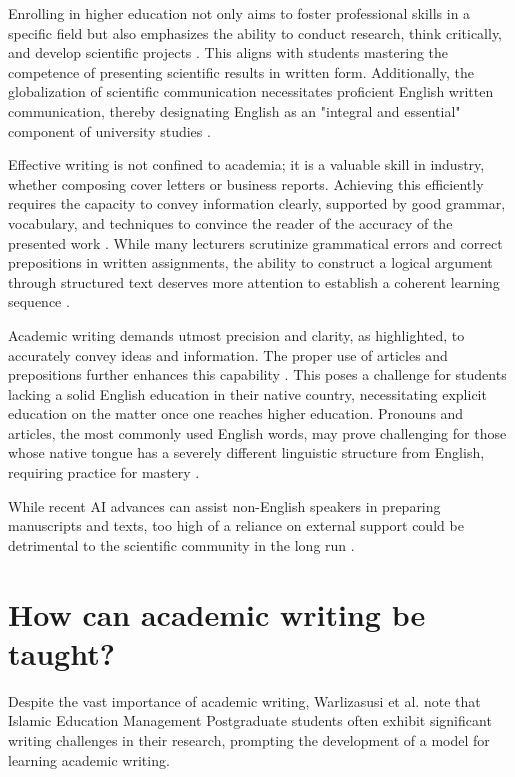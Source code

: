 \documentclass[a4paper,12pt]{article}
\begin{document}
Enrolling in higher education not only aims to foster professional skills in a specific field but also emphasizes the ability to conduct research, think critically, and develop scientific projects \cite{Source2}. This aligns with students mastering the competence of presenting scientific results in written form. Additionally, the globalization of scientific communication necessitates proficient English written communication, thereby designating English as an "integral and essential" component of university studies \cite{Source2}.

Effective writing is not confined to academia; it is a valuable skill in industry, whether composing cover letters or business reports. Achieving this efficiently requires the capacity to convey information clearly, supported by good grammar, vocabulary, and techniques to convince the reader of the accuracy of the presented work \cite{Source2}. While many lecturers scrutinize grammatical errors and correct prepositions in written assignments, the ability to construct a logical argument through structured text deserves more attention to establish a coherent learning sequence \cite{Source2}.

Academic writing demands utmost precision and clarity, as highlighted, to accurately convey ideas and information. The proper use of articles and prepositions further enhances this capability \cite{Source3}. This poses a challenge for students lacking a solid English education in their native country, necessitating explicit education on the matter once one reaches higher education. Pronouns and articles, the most commonly used English words, may prove challenging for those whose native tongue has a severely different linguistic structure from English, requiring practice for mastery \cite{Source3}.

While recent AI advances can assist non-English speakers in preparing manuscripts and texts, too high of a reliance on external support could be detrimental to the scientific community in the long run \cite{Source3}.

\section{How can academic writing be taught?}

Despite the vast importance of academic writing, Warlizasusi et al. \cite{Source4} note that Islamic Education Management Postgraduate students often exhibit significant writing challenges in their research, prompting the development of a model for learning academic writing.
\end{document}
